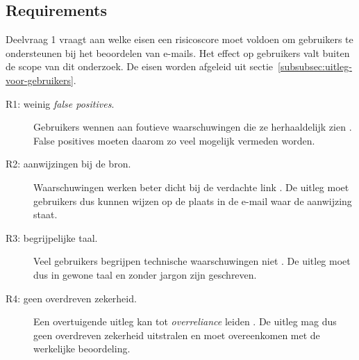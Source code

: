 \subsection{Requirements}
\label{subsec:requirements}
Deelvraag 1 vraagt aan welke eisen een risicoscore moet voldoen om gebruikers te ondersteunen bij het beoordelen van e-mails. Het effect op gebruikers valt buiten de scope van dit onderzoek. De eisen worden afgeleid uit sectie~\ref{subsubsec:uitleg-voor-gebruikers}.

\begin{description}
  \item[R1: weinig \emph{false positives}.] Gebruikers wennen aan foutieve waarschuwingen die ze herhaaldelijk zien \autocite{Anderson2015}. False positives moeten daarom zo veel mogelijk vermeden worden.
  \item[R2: aanwijzingen bij de bron.] Waarschuwingen werken beter dicht bij de verdachte link \autocite{Petelka2019}. De uitleg moet gebruikers dus kunnen wijzen op de plaats in de e-mail waar de aanwijzing staat.
  \item[R3: begrijpelijke taal.] Veel gebruikers begrijpen technische waarschuwingen niet \autocite{Egelman2008}. De uitleg moet dus in gewone taal en zonder jargon zijn geschreven.
  \item[R4: geen overdreven zekerheid.] Een overtuigende uitleg kan tot \emph{overreliance} leiden \autocite{Bucinca2021}. De uitleg mag dus geen overdreven zekerheid uitstralen en moet overeenkomen met de werkelijke beoordeling.
\end{description}